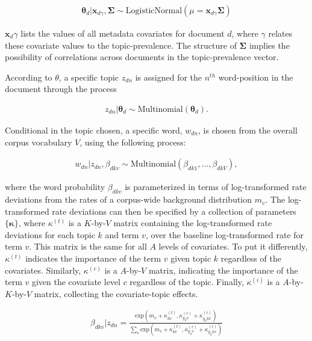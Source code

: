 \documentclass[12pt,a4paper,notitlepage]{article}
\begin{document}
\begin{align*}
	\boldsymbol{\theta}_d|\boldsymbol{x}_{d\gamma},\boldsymbol{\Sigma} \sim \textrm{LogisticNormal}(\mu = \boldsymbol{x}_{d\gamma}\boldsymbol{\Sigma})
\end{align*}

$\boldsymbol{x}_d\gamma$ lists the values of all metadata covariates for document $d$, where $\gamma$ relates these covariate values to the topic-prevalence. The structure of $\boldsymbol{\Sigma}$ implies the possibility of correlations across documents in the topic-prevalence vector. 

According to $\theta$, a specific topic $z_{dn}$ is assigned for the $n^{th}$ word-position in the document through the process

\begin{align*}
	z_{dn}|\boldsymbol{\theta}_d \sim \textrm{Multinomial}(\boldsymbol{\theta}_d).
\end{align*}

Conditional in the topic chosen, a specific word, $w_{dn}$, is chosen from the overall corpus vocabulary $V$, using the following process:

\begin{align*}
	w_{dn}|z_{dn},\beta_{dkv} \sim \textrm{Multinomial}(\beta_{dk1},...,\beta_{dkV}),
\end{align*}

where the word probability $\beta_{dkv}$ is parameterized in terms of log-transformed rate deviations from the rates of a corpus-wide background distribution $m_v$. The log-transformed rate deviations can then be specified by a collection of parameters $\lbrace \boldsymbol{\kappa} \rbrace$, where $\kappa^{(t)}$ is a $K$-by-$V$ matrix containing the log-transformed rate deviations for each topic $k$ and term $v$, over the baseline log-transformed rate for term $v$. This matrix is the same for all $A$ levels of covariates. To put it differently, $\kappa^{(t)}$ indicates the importance of the term $v$ given topic $k$ regardless of the covariates. Similarly, $\kappa^{(c)}$ is a $A$-by-$V$ matrix, indicating the importance of the term $v$ given the covariate level $c$ regardless of the topic. Finally, $\kappa^{(i)}$ is a $A$-by-$K$-by-$V$ matrix, collecting the covariate-topic effects.

\begin{align*}
	\beta_{dkv}|z_{dn}=\frac{\textrm{exp}(m_v+\kappa^{(t)}_{kv},\kappa^{(c)}_{y_dv}+\kappa^{(i)}_{y_dkv})}{\sum_v \textrm{exp}(m_v+\kappa^{(t)}_{kv},\kappa^{(c)}_{y_dv}+\kappa^{(i)}_{y_dkv})}
\end{align*}
\end{document}
